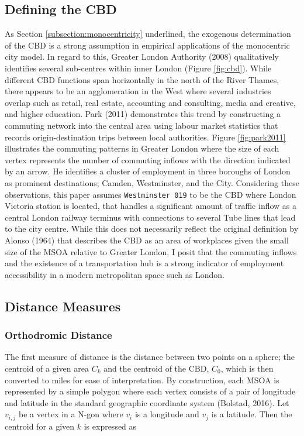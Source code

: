 \documentclass{article}
\begin{document}
\subsection{Defining the CBD}\label{subsection:CBD}
As Section \ref{subsection:monocentricity} underlined, the exogenous determination of the CBD is a strong assumption in empirical applications of the monocentric city model. In regard to this, Greater London Authority (2008) qualitatively identifies several sub-centres within inner London (Figure \ref{fig:cbd}). While different CBD functions span horizontally in the north of the River Thames, there appears to be an agglomeration in the West where several industries overlap such as retail, real estate, accounting and consulting, media and creative, and higher education. Park (2011) demonstrates this trend by constructing a commuting network into the central area using labour market statistics that records origin-destination trips between local authorities. Figure \ref{fig:park2011} illustrates the commuting patterns in Greater London where the size of each vertex represents the number of commuting inflows with the direction indicated by an arrow. He identifies a cluster of employment in three boroughs of London as prominent destinations; Camden, Westminster, and the City. Considering these observations, this paper assumes  \texttt{Westminster 019} to be the CBD where London Victoria station is located, that handles a significant amount of traffic inflow as a central London railway terminus with connections to several Tube lines that lead to the city centre. While this does not necessarily reflect the original definition by Alonso (1964) that describes the CBD as an area of workplaces given the small size of the MSOA relative to Greater London, I posit that the commuting inflows and the existence of a transportation hub is a strong indicator of employment accessibility in a modern metropolitan space such as London.

\subsection{Distance Measures}
\subsubsection{Orthodromic Distance}
The first measure of distance is the distance between two points on a sphere; the centroid of a given area $C_k$ and the centroid of the CBD, $C_0$, which is then converted to miles for ease of interpretation. By construction, each MSOA is represented by a simple polygon where each vertex consists of a pair of longitude and latitude in the standard geographic coordinate system (Bolstad, 2016). Let $v_{i,j}$ be a vertex in a N-gon where $v_i$ is a longitude and $v_j$ is a latitude. Then the centroid for a given $k$ is expressed as 
\end{document}
